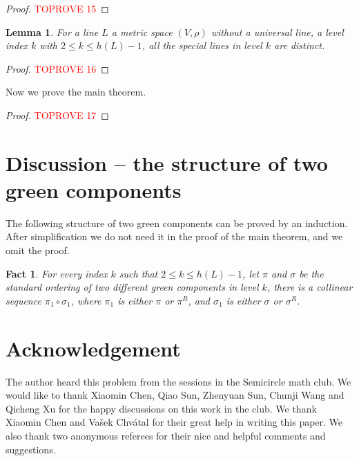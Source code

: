 \documentclass[12pt]{article}
\newtheorem{lem}{Lemma}
\newtheorem{fact}{Fact}
\begin{document}
\begin{proof}\textcolor{red}{TOPROVE 15}\end{proof}

\begin{lem}\label{lem.distinct_lines}
For a line $L$ a metric space $(V, \rho)$ without a universal line,
a level index $k$ with $2 \le k \le h(L)-1$, all the special lines in level $k$
are distinct. 
\end{lem}

\begin{proof}\textcolor{red}{TOPROVE 16}\end{proof}

Now we prove the main theorem.

\begin{proof}\textcolor{red}{TOPROVE 17}\end{proof}

\section{Discussion -- the structure of two green components}

The following structure of two green components can be proved by an induction.
After simplification we do not need it in the proof of the main theorem, and
we omit the proof.

\begin{fact}\label{fact.P_line_plus}
For every index $k$ such that $2 \le  k \le h(L)-1$, let $\pi$ and $\sigma$
be the standard ordering of two different green components in 
level $k$,
there is a collinear sequence $\pi_1 \circ \sigma_1$,
where $\pi_1$ is either $\pi$ or $\pi^R$,
and $\sigma_1$ is either $\sigma$ or $\sigma^R$.
\end{fact}

\section*{Acknowledgement}

The author heard this problem from the sessions in the Semicircle math club.
We would like to thank Xiaomin Chen, Qiao Sun, Zhenyuan Sun, Chunji Wang and Qicheng Xu
for the happy discussions on this work in the club.
We thank Xiaomin Chen and Va\v{s}ek Chv\'atal for their
great help in writing this paper.
We also thank two anonymous referees for their nice and 
helpful comments and suggestions.
\end{document}
